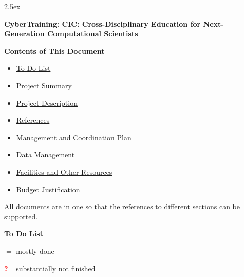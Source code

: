 \documentclass[11pt]{NSFamsart}
\newcommand{\notyet}{\textcolor{red}{\textbf{?}}}
\newcommand{\done}{\textcolor{green}{\checkmark}}
\begin{document}
\leftmargini2.5ex %
\begin{center}
{\LARGE \textbf{CyberTraining: CIC:  Cross-Disciplinary Education for Next-Generation Computational Scientists}}
\end{center}

\vspace{5ex}

\centerline{\Large \textbf{Contents of This Document}}
\bigskip
\begin{itemize}
\item \hyperlink{ToDo}{To Do List}
\item \hyperlink{ProjSumm}{Project Summary}
\item \hyperlink{ProjDesc}{Project Description}
\item \hyperlink{Refer}{References}
\item \hyperlink{Manage}{Management and Coordination Plan}
\item \hyperlink{DataManage}{Data Management}
\item \hyperlink{Facilities}{Facilities and Other Resources}
\item \hyperlink{BudgetJust}{Budget Justification}
\end{itemize}

All documents are in one so that the references to different sections can be supported.

\newpage \setcounter{page}{1} %

\centerline{\Large \textbf{To Do List}}\hypertarget{ToDo}{}

\noindent \done $=$ mostly done

\noindent \notyet = substantially not finished
\end{document}
